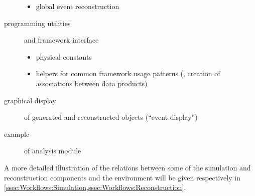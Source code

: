 \begin{description}
\begin{itemize}
         \item global event reconstruction
      \end{itemize}
   \item[programming utilities] and framework interface
      \begin{itemize}
         \item physical constants
         \item helpers for common framework usage patterns (\eg, creation of associations between data products)
      \end{itemize}
   \item[graphical display] of generated and reconstructed objects (``event display'')
   \item[example] of analysis module
\end{description}
A more detailed illustration of the relations between some of the simulation and reconstruction components and the environment
will be given respectively in \cref{ssec:Workflows:Simulation,ssec:Workflows:Reconstruction}.
